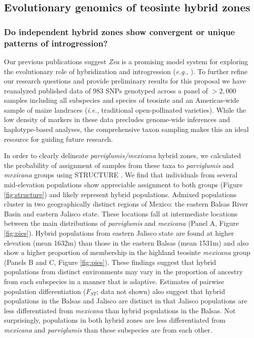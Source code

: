 \subsection{Evolutionary genomics of teosinte hybrid zones}
\label{ss:hybrids}
\subsubsection{Do independent hybrid zones show convergent or unique patterns of introgression?}
\label{sss:genomescan}

Our previous publications suggest \emph{Zea} is a promising model system for exploring the evolutionary role of hybridization and introgression (\emph{e.g.},  \citealt{Ross-Ibarra2009a, vanheerwaarden2011a, Hufford2013, Pyhajarvi2013}).  
To further refine our research questions and provide preliminary results for this proposal we have reanalyzed published data \citep{Fang2012} of 983 SNPs genotyped across a panel of $>2,000$ samples including all subspecies and species of teosinte and an Americas-wide sample of maize landraces (\emph{i.e.}, traditional open-pollinated varieties).
While the low density of markers in these data precludes genome-wide inferences and haplotype-based analyses, the comprehensive taxon sampling makes this an ideal resource for guiding future research.

In order to clearly delineate \emph{parviglumis/mexicana} hybrid zones, we calculated the probability of assignment of samples from these taxa to \emph{parviglumis} and \emph{mexicana} groups using STRUCTURE \citep{Pritchard2000}.  We find that individuals from several mid-elevation populations show appreciable assignment to both groups (Figure \ref{fig:structure}) and likely represent hybrid populations.  
Admixed populations cluster in two geographically distinct regions of Mexico: the eastern Balsas River Basin and eastern Jalisco state.
These locations fall at intermediate locations between the main distributions of \emph{parviglumis} and \emph{mexicana} (Panel A, Figure \ref{fig:pies}).
Hybrid populations from eastern Jalisco state are found at higher elevation (mean 1632m) than those in the eastern Balsas (mean 1531m) and also show a higher proportion of membership in the highland teosinte \emph{mexicana} group (Panels B and C, Figure \ref{fig:pies}).
These findings suggest that hybrid populations from distinct environments may vary in the proportion of ancestry from each subspecies in a manner that is adaptive.
Estimates of pairwise population differentiation ($F_{ST}$; data not shown) also suggest that hybrid populations in the Balsas and Jalisco are distinct in that Jalisco populations are less differentiated from \emph{mexicana} than hybrid populations in the Balsas.  Not surprisingly, populations in both hybrid zones are less differentiated from \emph{mexicana} and \emph{parviglumis} than these subspecies are from each other. 

